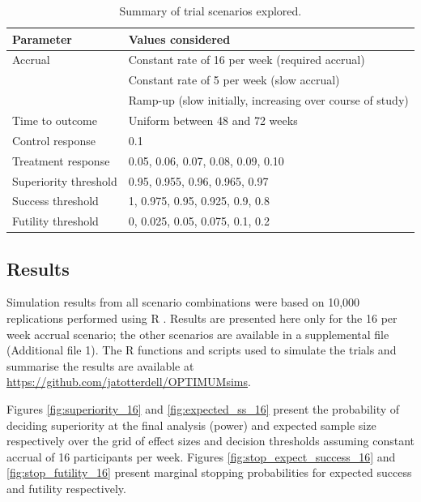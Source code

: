 \documentclass{bmcart}
\begin{document}
\begin{table}[!ht]
	\caption{Summary of trial scenarios explored.}
	\label{tab:scenarios}
	\begin{tabular}{ll}
		Parameter & Values considered \\ \hline
		Accrual & Constant rate of 16 per week (required accrual) \\
		& Constant rate of 5 per week (slow accrual) \\
		& Ramp-up (slow initially, increasing over course of study) \\
		Time to outcome & Uniform between 48 and 72 weeks \\
		Control response & 0.1 \\
		Treatment response & 0.05, 0.06, 0.07, 0.08, 0.09, 0.10 \\
		Superiority threshold & 0.95, 0.955, 0.96, 0.965, 0.97 \\
		Success threshold & 1, 0.975, 0.95, 0.925, 0.9, 0.8 \\
		Futility threshold & 0, 0.025, 0.05, 0.075, 0.1, 0.2 \\
		\hline
	\end{tabular}
\end{table}

\subsection*{Results}

Simulation results from all scenario combinations were based on 10,000 replications performed using R \cite{rlang}.
Results are presented here only for the 16 per week accrual scenario; the other scenarios are available in a supplemental file (Additional file 1).
The R functions and scripts used to simulate the trials and summarise the results are available at \url{https://github.com/jatotterdell/OPTIMUMsims}.

Figures \ref{fig:superiority_16} and \ref{fig:expected_ss_16} present the probability of deciding superiority at the final analysis (power) and expected sample size respectively over the grid of effect sizes and decision thresholds assuming constant accrual of 16 participants per week.
Figures \ref{fig:stop_expect_success_16} and \ref{fig:stop_futility_16} present marginal stopping probabilities for expected success and futility respectively.
\end{document}
